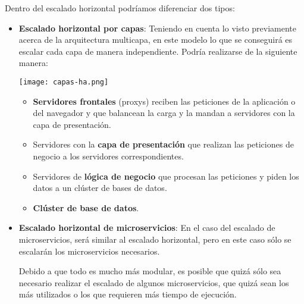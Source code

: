 Dentro del escalado horizontal podríamos diferenciar dos tipos:
\begin{itemize}
    \item \textbf{Escalado horizontal por capas}: Teniendo en cuenta lo visto previamente acerca de la arquitectura multicapa, en este modelo lo que se conseguirá es escalar cada capa de manera independiente. Podría realizarse de la siguiente manera:
    \begin{center}
        \texttt{[image: capas-ha.png]}
    \end{center}
    \begin{itemize}
        \item \textbf{Servidores frontales} (proxys) reciben las peticiones de la aplicación o del navegador y que balancean la carga y la mandan a servidores con la capa de presentación.
        \item Servidores con la \textbf{capa de presentación} que realizan las peticiones de negocio a los servidores correspondientes.
        \item Servidores de \textbf{lógica de negocio} que procesan las peticiones y piden los datos a un clúster de bases de datos.
        \item \textbf{Clúster de base de datos}.
    \end{itemize}

    \item \textbf{Escalado horizontal de microservicios}: En el caso del escalado de microservicios, será similar al escalado horizontal, pero en este caso sólo se escalarán los microservicios necesarios.

    Debido a que todo es mucho más modular, es posible que quizá sólo sea necesario realizar el escalado de algunos microservicios, que quizá sean los más utilizados o los que requieren más tiempo de ejecución.
\end{itemize}